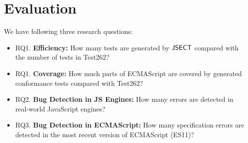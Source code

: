 \section{Evaluation}\label{sec:eval}

We have following three research questions:

\begin{itemize}
  \item RQ1. \textbf{Efficiency:} How many tests are generated by $\text{\sf JSECT}$
    compared with the number of tests in Test262?
  \item RQ1. \textbf{Coverage:} How much parts of ECMAScript are covered by
    generated conformance tests compared with Test262?
  \item RQ2. \textbf{Bug Detection in JS Engines:} How many errors are detected
    in real-world JavaScript engines?
  \item RQ3. \textbf{Bug Detection in ECMAScript:} How many specification errors
    are detected in the most recent version of ECMAScript (ES11)?
\end{itemize}
